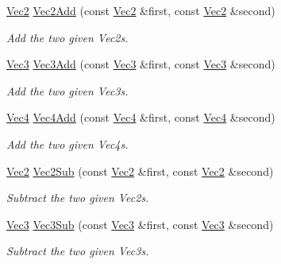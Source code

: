 {\bf }\par
\begin{DoxyCompactItemize}
\item 
\hyperlink{classgfxmath_1_1_vec2}{Vec2} \hyperlink{group___s_i_s_d_vec_math_gac9d2c898c69c771b9d9993a4c4f1a146}{Vec2\+Add} (const \hyperlink{classgfxmath_1_1_vec2}{Vec2} \&first, const \hyperlink{classgfxmath_1_1_vec2}{Vec2} \&second)
\begin{DoxyCompactList}\small\item\em Add the two given Vec2s. \end{DoxyCompactList}\item 
\hyperlink{classgfxmath_1_1_vec3}{Vec3} \hyperlink{group___s_i_s_d_vec_math_gac3979900225f137a1486a4491d0fb6d8}{Vec3\+Add} (const \hyperlink{classgfxmath_1_1_vec3}{Vec3} \&first, const \hyperlink{classgfxmath_1_1_vec3}{Vec3} \&second)
\begin{DoxyCompactList}\small\item\em Add the two given Vec3s. \end{DoxyCompactList}\item 
\hyperlink{classgfxmath_1_1_vec4}{Vec4} \hyperlink{group___s_i_s_d_vec_math_ga8812efd4565ada77e6dab63828ad715b}{Vec4\+Add} (const \hyperlink{classgfxmath_1_1_vec4}{Vec4} \&first, const \hyperlink{classgfxmath_1_1_vec4}{Vec4} \&second)
\begin{DoxyCompactList}\small\item\em Add the two given Vec4s. \end{DoxyCompactList}\item 
\hyperlink{classgfxmath_1_1_vec2}{Vec2} \hyperlink{group___s_i_s_d_vec_math_gabc910528ba2f4f4c3b69bf432e5c7731}{Vec2\+Sub} (const \hyperlink{classgfxmath_1_1_vec2}{Vec2} \&first, const \hyperlink{classgfxmath_1_1_vec2}{Vec2} \&second)
\begin{DoxyCompactList}\small\item\em Subtract the two given Vec2s. \end{DoxyCompactList}\item 
\hyperlink{classgfxmath_1_1_vec3}{Vec3} \hyperlink{group___s_i_s_d_vec_math_gae7189108aa879fb16ce9afd17052ac16}{Vec3\+Sub} (const \hyperlink{classgfxmath_1_1_vec3}{Vec3} \&first, const \hyperlink{classgfxmath_1_1_vec3}{Vec3} \&second)
\begin{DoxyCompactList}\small\item\em Subtract the two given Vec3s. \end{DoxyCompactList}\item 

\end{DoxyCompactItemize}
